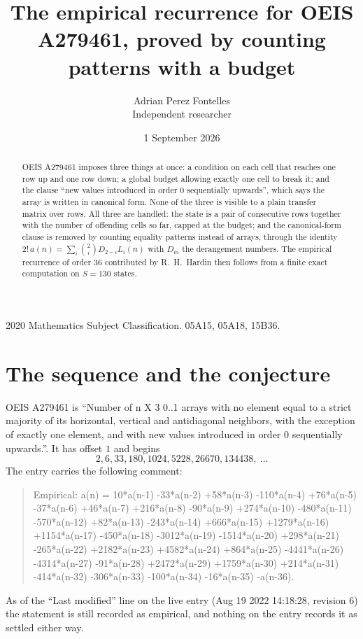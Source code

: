 \documentclass[11pt,a4paper]{article}
\title{The empirical recurrence for OEIS A279461, proved by counting patterns with a budget}
\author{Adrian Perez Fontelles\\ \small Independent researcher}
\date{1 September 2026}
\theoremstyle{plain}
\theoremstyle{definition}
\begin{document}
\maketitle

\begin{abstract}
OEIS A279461 imposes three things at once: a condition on each cell that reaches one row up and
one row down; a global budget allowing exactly one cell to
break it; and the clause ``new values introduced in order $0$ sequentially upwards'', which
says the array is written in canonical form. None of the three is visible to a plain transfer
matrix over rows. All three are handled: the state is a pair of consecutive rows
together with the number of offending cells so far, capped at the budget; and the
canonical-form clause is removed by counting equality patterns instead of arrays, through the
identity $2!\,a(n)=\sum_i\binom{2}{i}D_{2-i}L_i(n)$ with $D_m$ the derangement
numbers. The empirical recurrence of order $36$ contributed by R.~H.~Hardin then follows
from a finite exact computation on $S=130$ states.
\end{abstract}

\noindent\small 2020 Mathematics Subject Classification. 05A15, 05A18, 15B36.\normalsize

\section{The sequence and the conjecture}

OEIS A279461 is ``Number of n X 3 0..1 arrays with no element equal to a strict majority of its horizontal, vertical and antidiagonal neighbors, with the exception of exactly one element, and with new values introduced in order 0 sequentially upwards.''. It has offset $1$ and begins
\[
2, 6, 33, 180, 1024, 5228, 26670, 134438,\ \dots
\]
The entry carries the following comment:
\begin{quote}\small
Empirical: a(n) = 10*a(n-1) -33*a(n-2) +58*a(n-3) -110*a(n-4) +76*a(n-5) -37*a(n-6) +46*a(n-7) +216*a(n-8) -90*a(n-9) +274*a(n-10) -480*a(n-11) -570*a(n-12) +82*a(n-13) -243*a(n-14) +666*a(n-15) +1279*a(n-16) +1154*a(n-17) -450*a(n-18) -3012*a(n-19) -1514*a(n-20) +298*a(n-21) -265*a(n-22) +2182*a(n-23) +4582*a(n-24) +864*a(n-25) -4441*a(n-26) -4314*a(n-27) -91*a(n-28) +2472*a(n-29) +1759*a(n-30) +214*a(n-31) -414*a(n-32) -306*a(n-33) -100*a(n-34) -16*a(n-35) -a(n-36).
\end{quote}
As of the ``Last modified'' line on the live entry (Aug 19 2022 14:18:28, revision 6) the statement is
still recorded as empirical, and nothing on the entry records it as settled either way.
\end{document}
